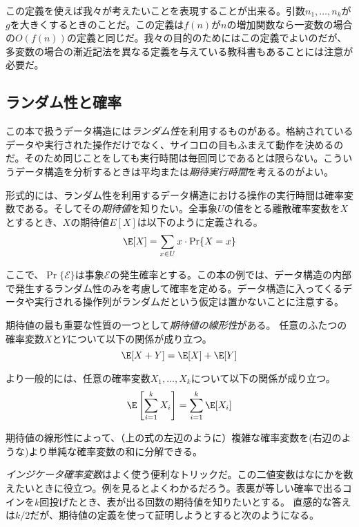 この定義を使えば我々が考えたいことを表現することが出来る。引数$n_1,\ldots,n_k$が$g$を大きくするときのことだ。この定義は$f(n)$が$n$の増加関数なら一変数の場合の$O(f(n))$の定義と同じだ。我々の目的のためにはこの定義でよいのだが、多変数の場合の漸近記法を異なる定義を与えている教科書もあることには注意が必要だ。

\subsection{ランダム性と確率}

%
%
%
%
この本で扱うデータ構造には\emph{ランダム性}を利用するものがある。格納されているデータや実行された操作だけでなく、サイコロの目もふまえて動作を決めるのだ。そのため同じことをしても実行時間は毎回同じであるとは限らない。こういうデータ構造を分析するときは平均または\emph{期待実行時間}を考えるのがよい。
%
%

形式的には、ランダム性を利用するデータ構造における操作の実行時間は確率変数である。そしてその\emph{期待値}を知りたい。全事象$U$の値をとる離散確率変数を$X$とするとき、$X$の期待値$E[X]$は以下のように定義される。
%
\[
    \E[X] = \sum_{x\in U} x\cdot\Pr\{X=x\}
\]

ここで、$\Pr\{\mathcal{E}\}$は事象$\mathcal{E}$の発生確率とする。この本の例では、データ構造の内部で発生するランダム性のみを考慮して確率を定める。データ構造に入ってくるデータや実行される操作列がランダムだという仮定は置かないことに注意する。

期待値の最も重要な性質の一つとして\emph{期待値の線形性}がある。
%
任意のふたつの確率変数$X$と$Y$について以下の関係が成り立つ。
\[
   \E[X+Y] = \E[X] + \E[Y]
\]

より一般的には、任意の確率変数$ X_1,\ldots,X_k $について以下の関係が成り立つ。
\[
   \E\left[\sum_{i=1}^k X_i\right] = \sum_{i=1}^k \E[X_i]
\]

期待値の線形性によって、（上の式の左辺のように）複雑な確率変数を(右辺のような)より単純な確率変数の和に分解できる。

\emph{インジケータ確率変数}はよく使う便利なトリックだ。この二値変数はなにかを数えたいときに役立つ。例を見るとよくわかるだろう。表裏が等しい確率で出るコインを$k$回投げたとき、表が出る回数の期待値を知りたいとする。
直感的な答えは$k/2$だが、期待値の定義を使って証明しようとすると次のようになる。

